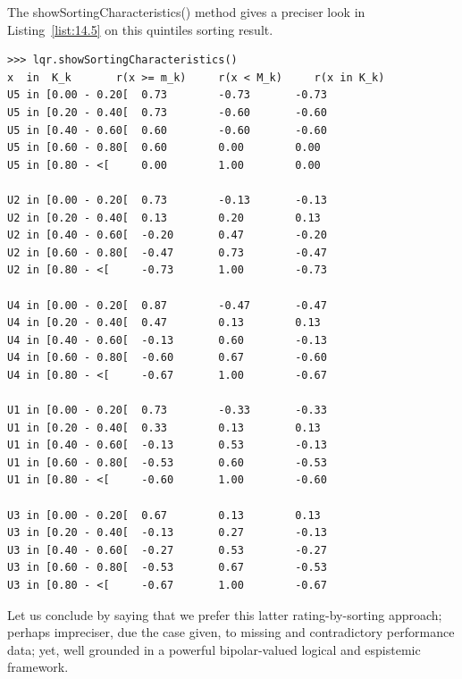 The showSortingCharacteristics() method gives a preciser look in Listing~\vref{list:14.5} on this quintiles sorting result.
\begin{lstlisting}[caption={Showing a quantiles sorting result},label=list:14.5,basicstyle=\ttfamily\scriptsize]
>>> lqr.showSortingCharacteristics()
x  in  K_k	     r(x >= m_k)     r(x < M_k)	    r(x in K_k)
U5 in [0.00 - 0.20[	 0.73		 -0.73		 -0.73
U5 in [0.20 - 0.40[	 0.73		 -0.60		 -0.60
U5 in [0.40 - 0.60[	 0.60		 -0.60		 -0.60
U5 in [0.60 - 0.80[	 0.60		 0.00		 0.00
U5 in [0.80 - <[	 0.00		 1.00		 0.00

U2 in [0.00 - 0.20[	 0.73		 -0.13		 -0.13
U2 in [0.20 - 0.40[	 0.13		 0.20		 0.13
U2 in [0.40 - 0.60[	 -0.20		 0.47		 -0.20
U2 in [0.60 - 0.80[	 -0.47		 0.73		 -0.47
U2 in [0.80 - <[	 -0.73		 1.00		 -0.73

U4 in [0.00 - 0.20[	 0.87		 -0.47		 -0.47
U4 in [0.20 - 0.40[	 0.47		 0.13		 0.13
U4 in [0.40 - 0.60[	 -0.13		 0.60		 -0.13
U4 in [0.60 - 0.80[	 -0.60		 0.67		 -0.60
U4 in [0.80 - <[	 -0.67		 1.00		 -0.67

U1 in [0.00 - 0.20[	 0.73		 -0.33		 -0.33
U1 in [0.20 - 0.40[	 0.33		 0.13		 0.13
U1 in [0.40 - 0.60[	 -0.13		 0.53		 -0.13
U1 in [0.60 - 0.80[	 -0.53		 0.60		 -0.53
U1 in [0.80 - <[	 -0.60		 1.00		 -0.60

U3 in [0.00 - 0.20[	 0.67		 0.13		 0.13
U3 in [0.20 - 0.40[	 -0.13		 0.27		 -0.13
U3 in [0.40 - 0.60[	 -0.27		 0.53		 -0.27
U3 in [0.60 - 0.80[	 -0.53		 0.67		 -0.53
U3 in [0.80 - <[	 -0.67		 1.00		 -0.67
\end{lstlisting}


Let us conclude by saying that we prefer this latter rating-by-sorting approach; perhaps impreciser, due the case given, to missing and contradictory performance data; yet, well grounded in a powerful bipolar-valued logical and espistemic framework.
 
\clearpage


%